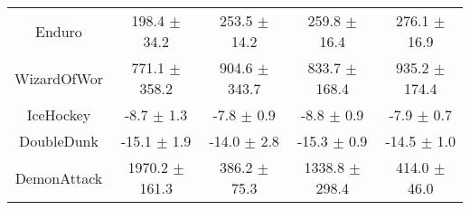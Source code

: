 \begin{table}[H]
{\begin{tabular}{ccccc}
Enduro        &      198.4 $\pm$ 34.2 &      253.5 $\pm$ 14.2 &      259.8 $\pm$ 16.4 &      276.1 $\pm$ 16.9 \\
WizardOfWor   &     771.1 $\pm$ 358.2 &     904.6 $\pm$ 343.7 &     833.7 $\pm$ 168.4 &     935.2 $\pm$ 174.4 \\
IceHockey     &        -8.7 $\pm$ 1.3 &        -7.8 $\pm$ 0.9 &        -8.8 $\pm$ 0.9 &        -7.9 $\pm$ 0.7 \\
DoubleDunk    &       -15.1 $\pm$ 1.9 &       -14.0 $\pm$ 2.8 &       -15.3 $\pm$ 0.9 &       -14.5 $\pm$ 1.0 \\
DemonAttack   &    1970.2 $\pm$ 161.3 &      386.2 $\pm$ 75.3 &    1338.8 $\pm$ 298.4 &      414.0 $\pm$ 46.0 \\
\bottomrule
\end{tabular}}
\end{table}



